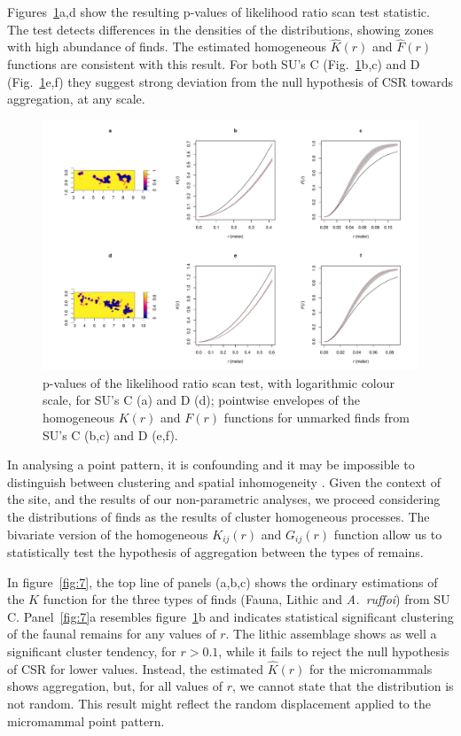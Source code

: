 \documentclass[review,authoryear]{elsarticle} %
\begin{document}
Figures~\ref{fig:6}a,d show the resulting p-values of likelihood ratio scan test statistic. The test detects differences in the densities of the distributions, showing zones with high abundance of finds. The estimated homogeneous $\hat K(r)$ and $\hat F(r)$ functions are consistent with this result. For both SU's C (Fig.~\ref{fig:6}b,c) and D (Fig.~\ref{fig:6}e,f) they suggest strong deviation from the null hypothesis of CSR towards aggregation, at any scale.

\begin{figure}
  \centering
  \includegraphics[width=1\textwidth]{../artwork/Fig6.pdf}
  \caption{p-values of the likelihood ratio scan test, with logarithmic colour scale, for SU's C (a) and D (d); pointwise envelopes of the homogeneous $K(r)$ and $F(r)$ functions for unmarked finds from SU's C (b,c) and D (e,f).}
  \label{fig:6}
\end{figure}

In analysing a point pattern, it is confounding and it may be impossible to distinguish between clustering and spatial inhomogeneity \citep{Baddeley2015}. Given the context of the site, and the results of our non-parametric analyses, we proceed considering the distributions of finds as the results of cluster homogeneous processes. The bivariate version of the homogeneous $K_{ij}(r)$ and $G_{ij}(r)$ function allow us to statistically test the hypothesis of aggregation between the types of remains.

In figure~\ref{fig:7}, the top line of panels (a,b,c) shows the ordinary estimations of the $K$ function for the three types of finds (Fauna, Lithic and \emph{A.~ruffoi}) from SU C. Panel~\ref{fig:7}a resembles figure~\ref{fig:6}b and indicates statistical significant clustering of the faunal remains for any values of $r$. The lithic assemblage shows as well a significant cluster tendency, for $r>0.1$, while it fails to reject the null hypothesis of CSR for lower values. Instead, the estimated $\hat{K}(r)$ for the micromammals shows aggregation, but, for all values of $r$, we cannot state that the distribution is not random. This result might reflect the random displacement applied to the micromammal point pattern.
\end{document}
